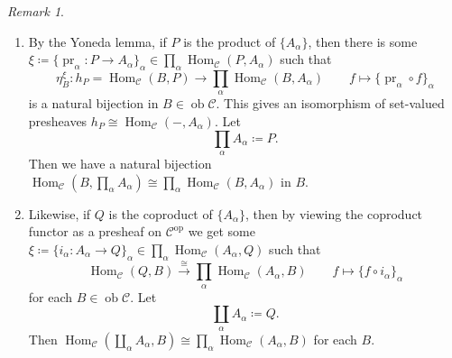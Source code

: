 \documentclass[10pt,letterpaper,cm]{nupset}
\theoremstyle{definition}
\theoremstyle{theorem}
\theoremstyle{remark}
\newtheorem{remark}[definition]{Remark}
\newcommand{\1}{\mathbf{1}}
\renewcommand{\c}{\mathscr{C}}
\newcommand{\0}{\vec 0}
\DeclareMathOperator{\op}{op}
\DeclareMathOperator{\ob}{ob}
\DeclareMathOperator{\pr}{pr}
\DeclareMathOperator{\Hom}{Hom}
\begin{document}
\begin{remark} $ $
\begin{enumerate}
\item By the Yoneda lemma, if $P$ is the product of $\{A_{\alpha}\}$, then there is some $\xi \coloneqq \{\pr_{\alpha} : P \to A_{\alpha}\}_{\alpha} \in \prod_{\alpha}\Hom_{\c}(P, A_{\alpha})$ such that $$\eta^{\xi}_B : h_P = \Hom_{\c}(B, P) \to \prod_{\alpha}\Hom_{\c} (B, A_{\alpha}) \quad \quad f \mapsto \{\pr_{\alpha} \circ f\}_{\alpha}$$ is a natural bijection in $B \in \ob \c$. This gives an isomorphism of set-valued presheaves $h_P \cong \Hom_{\c}(-, A_{\alpha})$. Let $$\prod_{\alpha} A_{\alpha} \coloneqq  P.$$ Then we have a natural bijection $\Hom_{\c}(B, \prod_{\alpha} A_{\alpha}) \cong \prod_{\alpha} \Hom_{\c}(B, A_{\alpha})$ in $B$.
\item Likewise, if $Q$ is the coproduct of $\{A_{\alpha}\}$, then by viewing the coproduct functor as a presheaf on $\c^{\op}$ we get some $\xi\coloneqq  \{i_{\alpha} : A_{\alpha} \to Q\}_{\alpha} \in \prod_{\alpha}\Hom_{\c}(A_{\alpha}, Q)$ such that $$\Hom_{\c} (Q, B) \overset{\cong}{\longrightarrow} \prod_{\alpha}\Hom_{\c} (A_{\alpha}, B) \quad \quad f \mapsto \{f \circ i_{\alpha}\}_{\alpha}$$ for each $B\in \ob \c$. Let $$\coprod_{\alpha} A_{\alpha} \coloneqq  Q.$$ Then $\Hom_{\c}(\coprod_{\alpha} A_{\alpha}, B) \cong \prod_{\alpha}\Hom_{\c}(A_{\alpha}, B)$ for each $B$.
\end{enumerate}
\end{remark}
\end{document}
